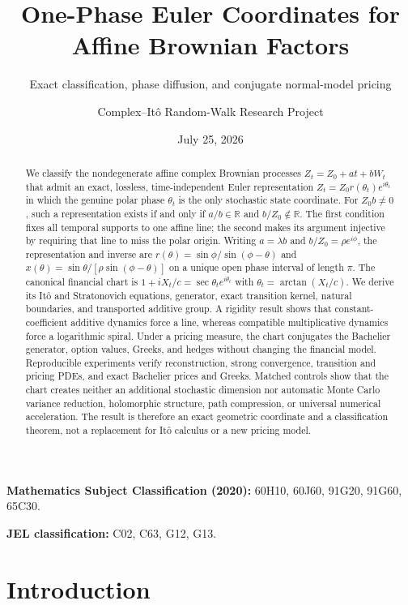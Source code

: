 \documentclass[
  english,
  10pt,
  letterpaper,
  DIV=11,
  numbers=noendperiod]{scrartcl}
\title{One-Phase Euler Coordinates for Affine Brownian Factors}
\subtitle{Exact classification, phase diffusion, and conjugate
normal-model pricing}
\author{Complex--Itô Random-Walk Research Project}
\date{July 25, 2026}
\renewcommand*\contentsname{Table of contents}
\newcommand\contentsname{Table of contents}
\theoremstyle{definition}
\theoremstyle{plain}
\theoremstyle{plain}
\theoremstyle{remark}
\begin{document}
\maketitle
\begin{abstract}
We classify the nondegenerate affine complex Brownian processes
\(Z_t=Z_0+at+bW_t\) that admit an exact, lossless, time-independent
Euler representation \(Z_t=Z_0r(\theta_t)e^{i\theta_t}\) in which the
genuine polar phase \(\theta_t\) is the only stochastic state
coordinate. For \(Z_0b\ne0\), such a representation exists if and only
if \(a/b\in\mathbb R\) and \(b/Z_0\notin\mathbb R\). The first condition
fixes all temporal supports to one affine line; the second makes its
argument injective by requiring that line to miss the polar origin.
Writing \(a=\lambda b\) and \(b/Z_0=\rho e^{i\phi}\), the representation
and inverse are \(r(\theta)=\sin\phi/\sin(\phi-\theta)\) and
\(x(\theta)=\sin\theta/[\rho\sin(\phi-\theta)]\) on a unique open phase
interval of length \(\pi\). The canonical financial chart is
\(1+iX_t/c=\sec\theta_t e^{i\theta_t}\) with
\(\theta_t=\arctan(X_t/c)\). We derive its Itô and Stratonovich
equations, generator, exact transition kernel, natural boundaries, and
transported additive group. A rigidity result shows that
constant-coefficient additive dynamics force a line, whereas compatible
multiplicative dynamics force a logarithmic spiral. Under a pricing
measure, the chart conjugates the Bachelier generator, option values,
Greeks, and hedges without changing the financial model. Reproducible
experiments verify reconstruction, strong convergence, transition and
pricing PDEs, and exact Bachelier prices and Greeks. Matched controls
show that the chart creates neither an additional stochastic dimension
nor automatic Monte Carlo variance reduction, holomorphic structure,
path compression, or universal numerical acceleration. The result is
therefore an exact geometric coordinate and a classification theorem,
not a replacement for Itô calculus or a new pricing model.
\end{abstract}

\renewcommand*\contentsname{Table of contents}
{
\setcounter{tocdepth}{2}
\tableofcontents
}

\textbf{Mathematics Subject Classification (2020):} 60H10, 60J60, 91G20,
91G60, 65C30.

\textbf{JEL classification:} C02, C63, G12, G13.

\section{Introduction}\label{sec-introduction}
\end{document}
